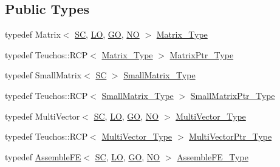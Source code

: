 \subsection*{Public Types}
\begin{DoxyCompactItemize}
\item 
typedef Matrix$<$ \hyperlink{fe__test__laplace_8cpp_a79c7e86a57edbb2a5a53242bcd04e41e}{SC}, \hyperlink{fe__test__laplace_8cpp_ad6a38c9f07d3fd633eefca5bccad8410}{LO}, \hyperlink{fe__test__laplace_8cpp_afa2946b509009b4f45eb04bd8c5b27d9}{GO}, \hyperlink{fe__test__laplace_8cpp_a5e24f37b28787429872b6ecb1d0417ce}{NO} $>$ \hyperlink{classFEDD_1_1AssembleFEAceLaplace_ad5a1d233cdc46488449047924e868010}{Matrix\+\_\+\+Type}
\item 
typedef Teuchos\+::\+R\+CP$<$ \hyperlink{classFEDD_1_1AssembleFEAceLaplace_ad5a1d233cdc46488449047924e868010}{Matrix\+\_\+\+Type} $>$ \hyperlink{classFEDD_1_1AssembleFEAceLaplace_aef601b47321c72006e231340b6b79f01}{Matrix\+Ptr\+\_\+\+Type}
\item 
typedef Small\+Matrix$<$ \hyperlink{fe__test__laplace_8cpp_a79c7e86a57edbb2a5a53242bcd04e41e}{SC} $>$ \hyperlink{classFEDD_1_1AssembleFEAceLaplace_a73514efbfcde00f29ef48aaffc8f964a}{Small\+Matrix\+\_\+\+Type}
\item 
typedef Teuchos\+::\+R\+CP$<$ \hyperlink{classFEDD_1_1AssembleFE_a8b8c588ba0cfaa200a74215f19e62722}{Small\+Matrix\+\_\+\+Type} $>$ \hyperlink{classFEDD_1_1AssembleFEAceLaplace_a80f37a68305eda24e2cd99eba578109b}{Small\+Matrix\+Ptr\+\_\+\+Type}
\item 
typedef Multi\+Vector$<$ \hyperlink{fe__test__laplace_8cpp_a79c7e86a57edbb2a5a53242bcd04e41e}{SC}, \hyperlink{fe__test__laplace_8cpp_ad6a38c9f07d3fd633eefca5bccad8410}{LO}, \hyperlink{fe__test__laplace_8cpp_afa2946b509009b4f45eb04bd8c5b27d9}{GO}, \hyperlink{fe__test__laplace_8cpp_a5e24f37b28787429872b6ecb1d0417ce}{NO} $>$ \hyperlink{classFEDD_1_1AssembleFEAceLaplace_ab83f539437114c2bd9855d6e3e17db75}{Multi\+Vector\+\_\+\+Type}
\item 
typedef Teuchos\+::\+R\+CP$<$ \hyperlink{classFEDD_1_1AssembleFEAceLaplace_ab83f539437114c2bd9855d6e3e17db75}{Multi\+Vector\+\_\+\+Type} $>$ \hyperlink{classFEDD_1_1AssembleFEAceLaplace_ab530cd4249acb1258dbe16a4db4e9930}{Multi\+Vector\+Ptr\+\_\+\+Type}
\item 
typedef \hyperlink{classFEDD_1_1AssembleFE}{Assemble\+FE}$<$ \hyperlink{fe__test__laplace_8cpp_a79c7e86a57edbb2a5a53242bcd04e41e}{SC}, \hyperlink{fe__test__laplace_8cpp_ad6a38c9f07d3fd633eefca5bccad8410}{LO}, \hyperlink{fe__test__laplace_8cpp_afa2946b509009b4f45eb04bd8c5b27d9}{GO}, \hyperlink{fe__test__laplace_8cpp_a5e24f37b28787429872b6ecb1d0417ce}{NO} $>$ \hyperlink{classFEDD_1_1AssembleFEAceLaplace_aa8feabd583240a7d1dc1f826ac01bdff}{Assemble\+F\+E\+\_\+\+Type}
\end{DoxyCompactItemize}
